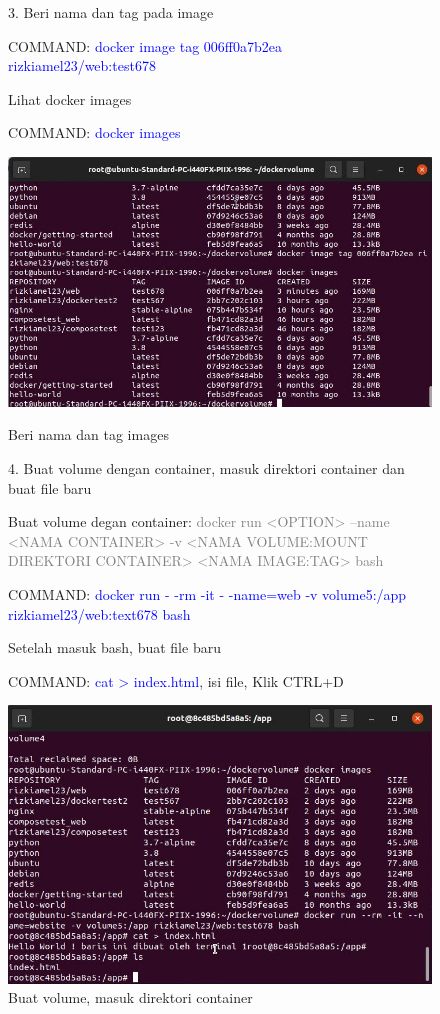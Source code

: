 \begin{figure}
    3. Beri nama dan tag pada image 
    
    COMMAND: \textcolor{Blue}{docker image tag 006ff0a7b2ea rizkiamel23/web:test678}
    
    Lihat docker images

    COMMAND: \textcolor{Blue}{docker images}
        \begin{center}
            \includegraphics[width=\linewidth]{image/43.jpg}
            \caption{Beri nama dan tag images}
            \label{fig:my_figure}
        \end{center}

    4. Buat volume dengan container, masuk direktori container dan buat file baru

    Buat volume degan container: \textcolor{Gray}{docker run <OPTION> --name <NAMA CONTAINER> -v 
    <NAMA VOLUME:MOUNT DIREKTORI CONTAINER> <NAMA IMAGE:TAG> bash}
    
    COMMAND: \textcolor{Blue}{docker run - -rm -it - -name=web -v volume5:/app rizkiamel23/web:text678 bash}
    
    Setelah masuk bash, buat file baru 
    
    COMMAND: \textcolor{Blue}{cat > index.html}, isi file, Klik CTRL+D
        \begin{center}
            \includegraphics[width=\linewidth]{image/64.jpg}
            \caption{Buat volume, masuk direktori container}
            \label{fig:my_figure}
        \end{center}
\end{figure}

